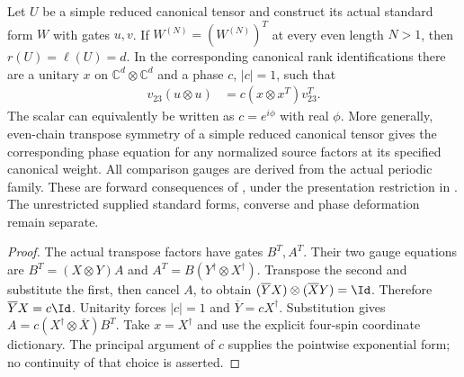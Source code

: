\begin{lemma}
    \label{lem:mpu_canonical_source_transposition_phase}
    \leanok
    Let $U$ be a simple reduced canonical tensor and construct its actual
    standard form $W$ with gates $u,v$. If
    $W^{(N)}=(W^{(N)})^T$ at every even length $N>1$, then $r(U)=\ell(U)=d$.
    In the corresponding canonical rank identifications there are a unitary
    $x$ on $\mathbb C^d\otimes\mathbb C^d$ and a phase $c$, $|c|=1$, such that
    \begin{align}
        v_{23}(u\otimes u) & =c(x\otimes x^T)v_{23}^T.
    \end{align}
    The scalar can equivalently be written as $c=e^{i\phi}$ with real $\phi$.
    More generally, even-chain transpose symmetry of a simple reduced canonical
    tensor gives the corresponding phase equation for any normalized source
    factors at its specified canonical weight. All comparison gauges are
    derived from the actual periodic family. These are forward consequences
    of \cite[lines~1258--1288]{Cirac2017MPU}, under the presentation restriction
    in \cite{gap:mpu_canonical_form_full_support}. The unrestricted supplied
    standard forms, converse and phase deformation remain separate.
\end{lemma}

\begin{proof}\leanok
    The actual transpose factors have gates $B^T,A^T$. Their two gauge
    equations are $B^T=(X\otimes Y)A$ and
    $A^T=B(Y^\dagger\otimes X^\dagger)$. Transpose the second and substitute
    the first, then cancel $A$, to obtain
    $(\overline YX)\otimes(\overline XY)=\Id$.
    Therefore $\overline YX=c\Id$. Unitarity forces $|c|=1$ and
    $\overline Y=cX^\dagger$. Substitution gives
    $A=c(X^\dagger\otimes\overline X)B^T$. Take $x=X^\dagger$ and use
    the explicit four-spin coordinate dictionary. The principal argument of
    $c$ supplies the pointwise exponential form; no continuity of that choice
    is asserted.
\end{proof}

